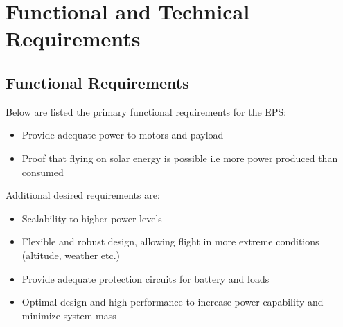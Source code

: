 \newpage
\section{Functional and Technical Requirements}
\label{sec:requirements}

\subsection{Functional Requirements}
%
Below are listed the primary functional requirements for the \ac{EPS}:
%
\begin{itemize}
\item Provide adequate power to motors and payload
\item Proof that flying on solar energy is possible i.e more power produced than consumed
\end{itemize}
%
Additional desired requirements are:
%
\begin{itemize}
\item Scalability to higher power levels
\item Flexible and robust design, allowing flight in more extreme conditions (altitude, weather etc.)
\item Provide adequate protection circuits for battery and loads
\item Optimal design and high performance to increase power capability and minimize system mass
\end{itemize}
%
%
